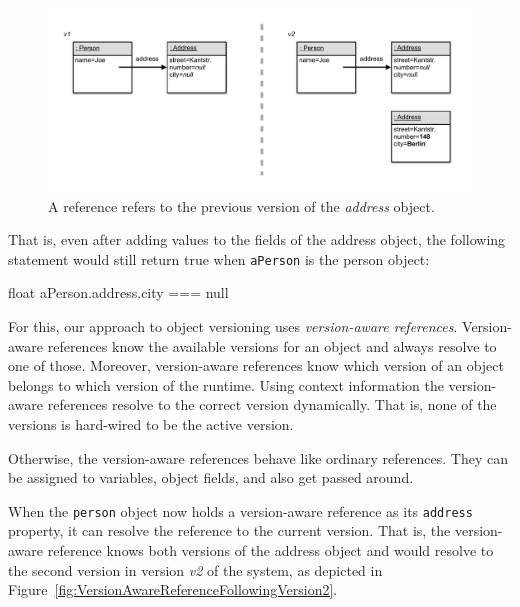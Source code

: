 \begin{figure}[h]
    \centering
    \includegraphics[width=\textwidth]{figures/4_approach/4_referenceToPreviousVersion.pdf}
    \caption{A reference refers to the previous version of the \emph{address} object.}
    \label{fig:ReferenceFixedToPreviousVersion}
\end{figure}

That is, even after adding values to the fields of the address object, the following statement would still return true when \lstinline{aPerson} is the person object:

\begin{code}{}{float}
aPerson.address.city === null
\end{code}
\iffalse
\end{verbatim}\fi

For this, our approach to object versioning uses \emph{version-aware references}.
Version-aware references know the available versions for an object and always resolve to one of those.
Moreover, version-aware references know which version of an object belongs to which version of the runtime.
Using context information the version-aware references resolve to the correct version dynamically.
That is, none of the versions is hard-wired to be the active version.

Otherwise, the version-aware references behave like ordinary references.
They can be assigned to variables, object fields, and also get passed around.

When the \lstinline{person} object now holds a version-aware reference as its \lstinline{address} property, it can resolve the reference to the current version.
That is, the version-aware reference knows both versions of the address object and would resolve to the second version in version \emph{v2} of the system, as depicted in Figure~\ref{fig:VersionAwareReferenceFollowingVersion2}.

